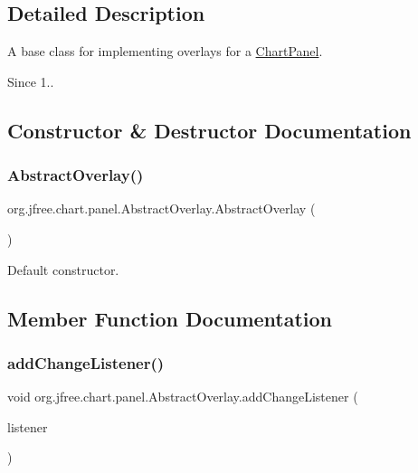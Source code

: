 \subsection{Detailed Description}
A base class for implementing overlays for a \mbox{\hyperlink{classorg_1_1jfree_1_1chart_1_1_chart_panel}{Chart\+Panel}}.

\begin{DoxySince}{Since}
1.. 
\end{DoxySince}


\subsection{Constructor \& Destructor Documentation}
\mbox{\label{classorg_1_1jfree_1_1chart_1_1panel_1_1_abstract_overlay_a9de5e83bac9db3f3e41e6df10da53153}} 
\subsubsection{\texorpdfstring{Abstract\+Overlay()}{AbstractOverlay()}}
{\footnotesize\ttfamily org.\+jfree.\+chart.\+panel.\+Abstract\+Overlay.\+Abstract\+Overlay (\begin{DoxyParamCaption}{ }\end{DoxyParamCaption})}

Default constructor. 

\subsection{Member Function Documentation}
\mbox{\label{classorg_1_1jfree_1_1chart_1_1panel_1_1_abstract_overlay_a987e3cccb62e8de2948b2228c6506b65}} 
\subsubsection{\texorpdfstring{add\+Change\+Listener()}{addChangeListener()}}
{\footnotesize\ttfamily void org.\+jfree.\+chart.\+panel.\+Abstract\+Overlay.\+add\+Change\+Listener (\begin{DoxyParamCaption}\item[{\mbox{\hyperlink{interfaceorg_1_1jfree_1_1chart_1_1event_1_1_overlay_change_listener}{Overlay\+Change\+Listener}}}]{listener }\end{DoxyParamCaption})}

